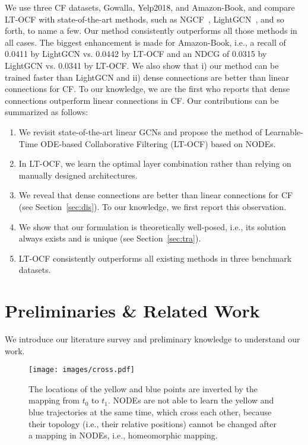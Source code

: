 \documentclass[sigconf]{acmart}
\begin{document}
We use three CF datasets, Gowalla, Yelp2018, and Amazon-Book, and compare LT-OCF with state-of-the-art methods, such as NGCF~\cite{10.1145/3331184.3331267}, LightGCN~\cite{10.1145/3397271.3401063}, and so forth, to name a few. Our method consistently outperforms all those methods in all cases. The biggest enhancement is made for Amazon-Book, i.e., a recall of 0.0411 by LightGCN vs. 0.0442 by LT-OCF and an NDCG of 0.0315 by LightGCN vs. 0.0341 by LT-OCF. We also show that i) our method can be trained faster than LightGCN and ii) dense connections are better than linear connections for CF. To our knowledge, we are the first who reports that dense connections outperform linear connections in CF. Our contributions can be summarized as follows:
\begin{enumerate}
    \item We revisit state-of-the-art linear GCNs and propose the method of Learnable-Time ODE-based Collaborative Filtering (LT-OCF) based on NODEs.
    \item In LT-OCF, we learn the optimal layer combination rather than relying on manually designed architectures.
    \item We reveal that dense connections are better than linear connections for CF (see Section~\ref{sec:dis}). To our knowledge, we first report this observation.
    \item We show that our formulation is theoretically well-posed, i.e., its solution always exists and is unique (see Section~\ref{sec:tra}).
    \item LT-OCF consistently outperforms all existing methods in three benchmark datasets.
\end{enumerate}


\section{Preliminaries \& Related Work}

We introduce our literature survey and preliminary knowledge to understand our work.

\begin{figure}
    \centering
    \texttt{[image: images/cross.pdf]}
    \caption{The locations of the yellow and blue points are inverted by the mapping from $t_0$ to $t_1$. NODEs are not able to learn the yellow and blue trajectories at the same time, which cross each other, because their topology (i.e., their relative positions) cannot be changed after a mapping in NODEs, i.e., homeomorphic mapping.}
    \label{fig:cross}
\end{figure}
\end{document}
